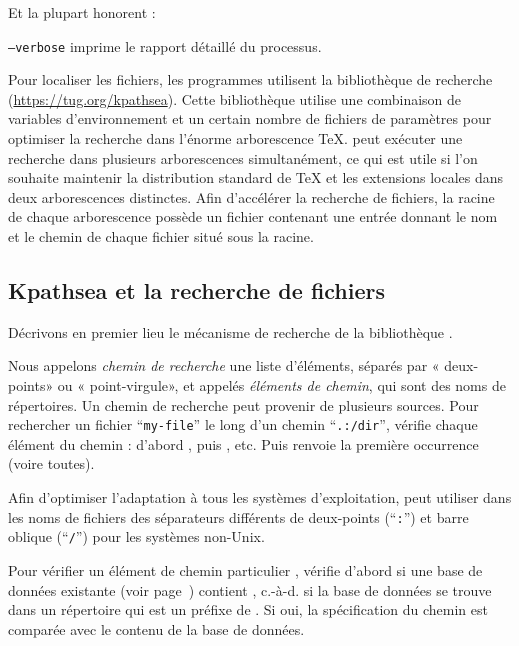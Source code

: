 \documentclass[german, english, french, 12pt]{article}
\renewcommand{\samp}[1]{\enquote{\texttt{#1}}}
\begin{document}
Et la plupart honorent :
\begin{ttdescription}
\item[\texttt{--verbose}] imprime le rapport détaillé du processus.
\end{ttdescription}

Pour localiser les fichiers, les programmes \Webc{} utilisent la bibliothèque de
recherche \KPS{} (\url{https://tug.org/kpathsea}). Cette bibliothèque utilise
une combinaison de variables d'environnement et un certain nombre de fichiers de
paramètres pour optimiser la recherche dans l'énorme arborescence \TeX{}.
\Webc{} peut exécuter une recherche dans plusieurs arborescences simultanément,
ce qui est utile si l'on souhaite maintenir la distribution standard de \TeX{}
et les extensions locales dans deux arborescences distinctes. Afin d'accélérer
la recherche de fichiers, la racine de chaque arborescence possède un fichier
 contenant une entrée donnant le nom et le chemin de chaque fichier
situé sous la racine.

\subsection{Kpathsea et la recherche de fichiers}
\label{sec:kpathsea}

Décrivons en premier lieu le mécanisme de recherche de la bibliothèque \KPS{}.

Nous appelons \emph{chemin de recherche} une liste d'éléments, séparés par
« deux-points» ou « point-virgule», et appelés \emph{éléments de chemin}, qui
sont des noms de répertoires.  Un chemin de recherche peut provenir de plusieurs
sources.  Pour rechercher un fichier \samp{my-file} le long d'un chemin
\samp{.:/dir}, \KPS{} vérifie chaque élément du chemin : d'abord
, puis , etc.  Puis \KPS{} renvoie la
première occurrence (voire toutes).

Afin d'optimiser l'adaptation à tous les systèmes d'exploitation, \KPS{} peut
utiliser dans les noms de fichiers des séparateurs différents de deux-points
(\samp{:}) et barre oblique (\samp{/}) pour les systèmes non-Unix.

Pour vérifier un élément de chemin particulier , \KPS{} vérifie d'abord
si une base de données existante (voir page~\pageref{sec:filename-database})
contient , c.-à-d. si la base de données se trouve dans un répertoire qui
est un préfixe de . Si oui, la spécification du chemin est comparée avec
le contenu de la base de données.
\end{document}
